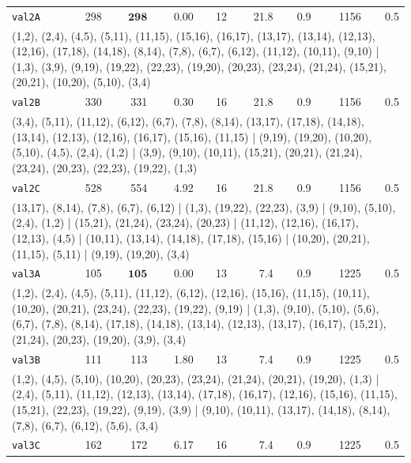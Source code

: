 \begin{longtable}{lrrrrrrrr}
\texttt{val2A} & 298 & $\mathbf{298}$ & 0.00 & 12 & 21.8 & 0.9 & 1156 & 0.5 \\
\multicolumn{9}{p{0.96\linewidth}}{\tiny\raggedright\arraybackslash (1,2), (2,4), (4,5), (5,11), (11,15), (15,16), (16,17), (13,17), (13,14), (12,13), (12,16), (17,18), (14,18), (8,14), (7,8), (6,7), (6,12), (11,12), (10,11), (9,10) | (1,3), (3,9), (9,19), (19,22), (22,23), (19,20), (20,23), (23,24), (21,24), (15,21), (20,21), (10,20), (5,10), (3,4)} \\[2pt]
\texttt{val2B} & 330 & 331 & 0.30 & 16 & 21.8 & 0.9 & 1156 & 0.5 \\
\multicolumn{9}{p{0.96\linewidth}}{\tiny\raggedright\arraybackslash (3,4), (5,11), (11,12), (6,12), (6,7), (7,8), (8,14), (13,17), (17,18), (14,18), (13,14), (12,13), (12,16), (16,17), (15,16), (11,15) | (9,19), (19,20), (10,20), (5,10), (4,5), (2,4), (1,2) | (3,9), (9,10), (10,11), (15,21), (20,21), (21,24), (23,24), (20,23), (22,23), (19,22), (1,3)} \\[2pt]
\texttt{val2C} & 528 & 554 & 4.92 & 16 & 21.8 & 0.9 & 1156 & 0.5 \\
\multicolumn{9}{p{0.96\linewidth}}{\tiny\raggedright\arraybackslash (13,17), (8,14), (7,8), (6,7), (6,12) | (1,3), (19,22), (22,23), (3,9) | (9,10), (5,10), (2,4), (1,2) | (15,21), (21,24), (23,24), (20,23) | (11,12), (12,16), (16,17), (12,13), (4,5) | (10,11), (13,14), (14,18), (17,18), (15,16) | (10,20), (20,21), (11,15), (5,11) | (9,19), (19,20), (3,4)} \\[2pt]
\texttt{val3A} & 105 & $\mathbf{105}$ & 0.00 & 13 & 7.4 & 0.9 & 1225 & 0.5 \\
\multicolumn{9}{p{0.96\linewidth}}{\tiny\raggedright\arraybackslash (1,2), (2,4), (4,5), (5,11), (11,12), (6,12), (12,16), (15,16), (11,15), (10,11), (10,20), (20,21), (23,24), (22,23), (19,22), (9,19) | (1,3), (9,10), (5,10), (5,6), (6,7), (7,8), (8,14), (17,18), (14,18), (13,14), (12,13), (13,17), (16,17), (15,21), (21,24), (20,23), (19,20), (3,9), (3,4)} \\[2pt]
\texttt{val3B} & 111 & 113 & 1.80 & 13 & 7.4 & 0.9 & 1225 & 0.5 \\
\multicolumn{9}{p{0.96\linewidth}}{\tiny\raggedright\arraybackslash (1,2), (4,5), (5,10), (10,20), (20,23), (23,24), (21,24), (20,21), (19,20), (1,3) | (2,4), (5,11), (11,12), (12,13), (13,14), (17,18), (16,17), (12,16), (15,16), (11,15), (15,21), (22,23), (19,22), (9,19), (3,9) | (9,10), (10,11), (13,17), (14,18), (8,14), (7,8), (6,7), (6,12), (5,6), (3,4)} \\[2pt]
\texttt{val3C} & 162 & 172 & 6.17 & 16 & 7.4 & 0.9 & 1225 & 0.5 \\

\end{longtable}
